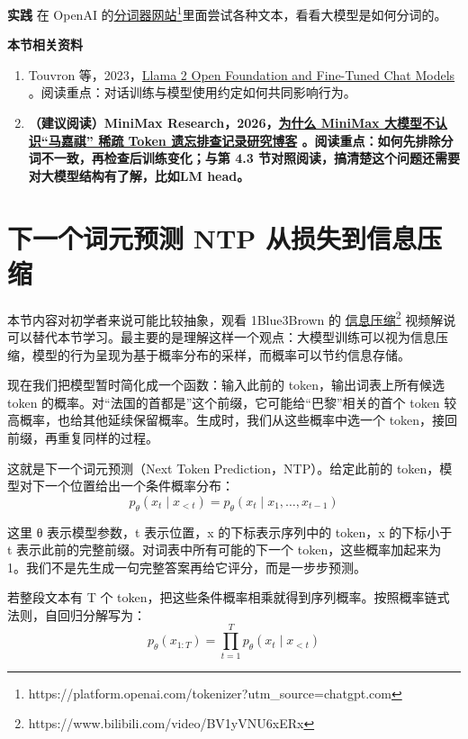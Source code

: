 \textbf{实践} 在 OpenAI 的\href{https://platform.openai.com/tokenizer?utm_source=chatgpt.com}{分词器网站}\footnote{https://platform.openai.com/tokenizer?utm\_source=chatgpt.com}里面尝试各种文本，看看大模型是如何分词的。

\textbf{本节相关资料}
\begin{enumerate}
    \item Touvron 等，2023，\href{https://arxiv.org/abs/2307.09288}{Llama 2 Open Foundation and Fine-Tuned Chat Models} 。阅读重点：对话训练与模型使用约定如何共同影响行为。
    \item \textbf{（建议阅读）MiniMax Research，2026，\href{https://www.minimax.cn/blog/sparse-token-forgetting-investigation}{为什么 MiniMax 大模型不认识``马嘉祺'' 稀疏 Token 遗忘排查记录研究博客} 。阅读重点：如何先排除分词不一致，再检查后训练变化；与第 4.3 节对照阅读，搞清楚这个问题还需要对大模型结构有了解，比如LM head。}
\end{enumerate}

\section{下一个词元预测 NTP 从损失到信息压缩}\label{下一个词元预测 NTP 从损失到信息压缩}

本节内容对初学者来说可能比较抽象，观看 1Blue3Brown 的 \href{https://www.bilibili.com/video/BV1yVNU6xERx}{{信息压缩}}\footnote{https://www.bilibili.com/video/BV1yVNU6xERx} 视频解说可以替代本节学习。最主要的是理解这样一个观点：大模型训练可以视为信息压缩，模型的行为呈现为基于概率分布的采样，而概率可以节约信息存储。

现在我们把模型暂时简化成一个函数：输入此前的 token，输出词表上所有候选 token 的概率。对``法国的首都是''这个前缀，它可能给``巴黎''相关的首个 token 较高概率，也给其他延续保留概率。生成时，我们从这些概率中选一个 token，接回前缀，再重复同样的过程。

这就是下一个词元预测（Next Token Prediction，NTP）。给定此前的 token，模型对下一个位置给出一个条件概率分布：
\[p_{\theta}\left( x_{t} \mid x_{< t} \right) = p_{\theta}\left( x_{t} \mid x_{1},\ldots,x_{t - 1} \right)\]

这里 θ 表示模型参数，t 表示位置，x 的下标表示序列中的 token，x 的下标小于 t 表示此前的完整前缀。对词表中所有可能的下一个 token，这些概率加起来为 1。我们不是先生成一句完整答案再给它评分，而是一步步预测。

若整段文本有 T 个 token，把这些条件概率相乘就得到序列概率。按照概率链式法则，自回归分解写为：
\[p_{\theta}\left( x_{1:T} \right) = \prod_{t = 1}^{T}p_{\theta}\left( x_{t} \mid x_{< t} \right)\]

